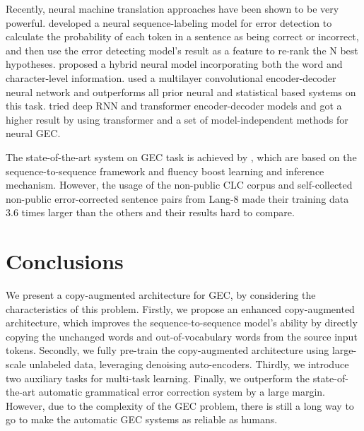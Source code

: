 \documentclass[11pt,a4paper]{article}
\begin{document}
Recently, neural machine translation approaches have been shown to be very powerful. \cite{yannakoudakis2017neural} developed a neural sequence-labeling model for error detection to calculate the probability of each token in a sentence as being correct or incorrect, and then use the error detecting model's result as a feature to re-rank the N best hypotheses. \cite{ji2017nested} proposed a hybrid neural model incorporating both the word and character-level information. \cite{chollampatt2018multilayer} used a multilayer convolutional encoder-decoder neural network and outperforms all prior neural and statistical based systems on this task. \cite{junczys2018approaching} tried deep RNN \cite{barone2017deep} and transformer \cite{vaswani2017attention} encoder-decoder models and got a higher result by using transformer and a set of model-independent methods for neural GEC. 

The state-of-the-art system on GEC task is achieved by \cite{ge2018reaching}, which are based on the sequence-to-sequence framework and fluency boost learning and inference mechanism. However, the usage of the non-public CLC corpus \cite{nicholls2003cambridge} and self-collected non-public error-corrected sentence pairs from Lang-8 made their training data 3.6 times larger than the others and their results hard to compare. 


\section{Conclusions}

We present a copy-augmented architecture for GEC, by considering the characteristics of this problem. Firstly, we propose an enhanced copy-augmented architecture, which improves the sequence-to-sequence model's ability by directly copying the unchanged words and out-of-vocabulary words from the source input tokens. Secondly, we fully pre-train the copy-augmented architecture using large-scale unlabeled data, leveraging denoising auto-encoders. Thirdly, we introduce two auxiliary tasks for multi-task learning. Finally, we outperform the state-of-the-art automatic grammatical error correction system by a large margin. However, due to the complexity of the GEC problem, there is still a long way to go to make the automatic GEC systems as reliable as humans.




\end{document}
